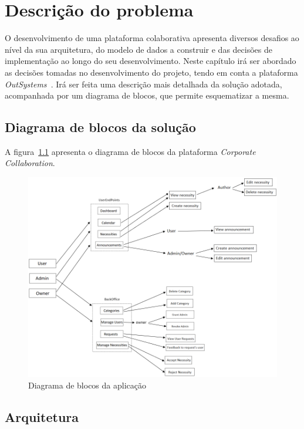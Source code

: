 \chapter{Descrição do problema}\label{chapter:description}

O desenvolvimento de uma plataforma colaborativa apresenta diversos desafios ao nível da sua arquitetura, 
do modelo de dados a construir e das decisões de implementação ao longo do seu desenvolvimento. 
Neste capítulo irá ser abordado as decisões tomadas no desenvolvimento do projeto, tendo em conta a plataforma \textit{OutSystems~\cite{outsystems}}. 
Irá ser feita uma descrição mais detalhada da solução adotada, acompanhada por um diagrama de blocos, que permite esquematizar a mesma.


\section{Diagrama de blocos da solução}\label{sec:diagram}
A figura~\ref{fig:diagram} apresenta o diagrama de blocos da plataforma \textit{Corporate Collaboration}. 

\begin{figure}[H]
  \centering
  \includegraphics[scale=0.4]{figures/Diagrama de blocos.png}
  \caption{Diagrama de blocos da aplicação}\label{fig:diagram}
\end{figure}

\newpage

\section{Arquitetura}\label{sec:arquitechture}

